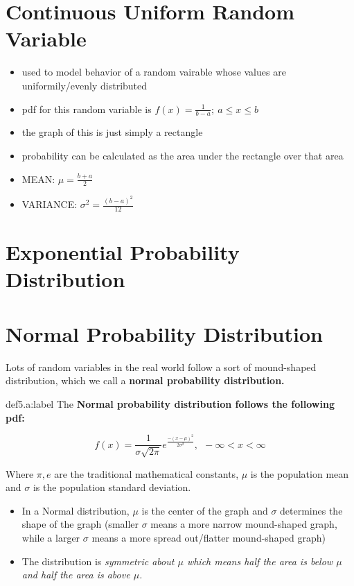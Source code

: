 \section{Continuous Uniform Random Variable}

\begin{itemize}
    \item used to model behavior of a random vairable whose values are uniformily/evenly distributed
    \item pdf for this random variable is $f(x) = \frac{1}{b-a}; \:a \le x \le b$
    \item the graph of this is just simply a rectangle
    \item probability can be calculated as the area under the rectangle over that area
    \item MEAN: $\mu = \frac{b+a}{2}$
    \item VARIANCE: $\sigma^2 = \frac{(b-a)^2}{12}$
\end{itemize}


\section{Exponential Probability Distribution}




\section{Normal Probability Distribution}

Lots of random variables in the real world follow a sort of mound-shaped distribution, which we call a \bf{normal probability distribution}. 

\begin{definition}{def5.a:label}
    The \bf{Normal probability distribution} follows the following pdf:

    $$
    f(x) = \frac{1}{\sigma\sqrt{2\pi}}e^{\frac{-(x-\mu)^2}{2\sigma^2}}, \:\: -\infty < x < \infty
    $$

    Where $\pi, e$ are the traditional mathematical constants, $\mu$ is the population mean and $\sigma$ is the population standard deviation.
\end{definition}

\begin{itemize}
    \item In a Normal distribution, $\mu$ is the center of the graph and $\sigma$ determines the shape of the graph (smaller $\sigma$ means a more narrow mound-shaped graph, while a larger $\sigma$ means a more spread out/flatter mound-shaped graph)
    \item The distribution is \it{symmetric} about $\mu$ which means half the area is below $\mu$ and half the area is above $\mu$. 
\end{itemize}


